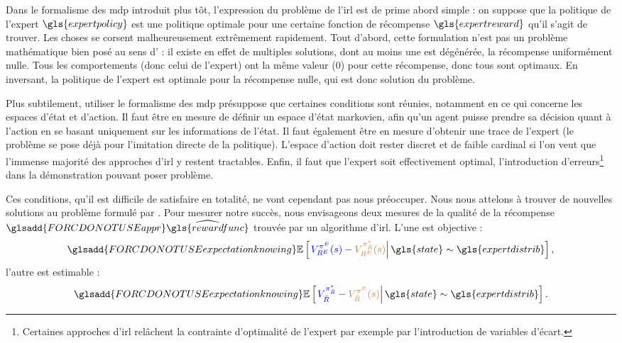\documentclass[frenchb,a4paper,justified,notoc]{tufte-book}
\newcommand{\rewardfunc}{\gls{rewardfunc}}
\newcommand{\expertreward}{\gls{expertreward}}
\newcommand{\state}{\gls{state}}
\newcommand{\expertpolicy}{\gls{expertpolicy}}
\newcommand{\expertdistrib}{\gls{expertdistrib}}
\newcommand{\appr}[1]{\ensuremath{\glsadd{FORCDONOTUSEappr}\widehat{#1}}}
\newcommand{\expectationknowing}[2]{\ensuremath{\glsadd{FORCDONOTUSEexpectationknowing}\mathbb{E} \left[\left. #1\right|#2\right]}}
\begin{document}
Dans le formalisme des \gls{mdp} introduit plus tôt, l'expression du problème de l'\gls{irl} est de prime abord simple : on suppose que la politique de l'expert $\expertpolicy$ est une politique optimale pour une certaine fonction de récompense $\expertreward$ qu'il s'agit de trouver.
Les choses se corsent malheureusement extrêmement rapidement. Tout d'abord, cette formulation n'est pas un problème mathématique bien posé au sens d'\citet{hadamard1902problemes} : il existe en effet de multiples solutions, dont au moins une est dégénérée, la récompense uniformément nulle. Tous les comportements (donc celui de l'expert) ont la même valeur ($0$) pour cette récompense, donc tous sont optimaux. En inversant, la politique de l'expert est optimale pour la récompense nulle, qui est donc solution du problème.

Plus subtilement, utiliser le formalisme des \gls{mdp} présuppose que certaines conditions sont réunies, notamment en ce qui concerne les espaces d'état et d'action. Il faut être en mesure de définir un espace d'état markovien, afin qu'un agent puisse prendre sa décision quant à l'action en se basant uniquement sur les informations de l'état. Il faut également être en mesure d'obtenir une trace de l'expert (le problème se pose déjà pour l'imitation directe de la politique). L'espace d'action doit rester discret et de faible cardinal si l'on veut que l'immense majorité des approches d'\gls{irl} y restent tractables. Enfin, il faut que l'expert soit effectivement optimal, l'introduction d'erreurs\footnote{Certaines approches d'\gls{irl} relâchent la contrainte d'optimalité de l'expert par exemple par l'introduction de variables d'écart.
 } dans la démonstration pouvant poser problème.

Ces conditions, qu'il est difficile de satisfaire en totalité, ne vont cependant pas nous préoccuper. Nous nous attelons à trouver de nouvelles solutions au problème formulé par \citet{russell1998learning}. Pour mesurer notre succès, nous envisageons deux mesures de la qualité de la récompense $\appr{\rewardfunc}$ trouvée par un algorithme d'\gls{irl}. L'une est objective :
\begin{equation}
\expectationknowing{{\color{blue}V^{\pi^E}_{R^E}(s)} - {\color{brown}V^{\pi^*_{\hat{R}}}_{R^E}(s)}}{\state\sim\expertdistrib},
\label{eq:aricriterebis}
\end{equation}
l'autre est estimable :
\begin{equation}
\expectationknowing{{\color{blue}V^{\pi^*_{\hat{R}}}_{\hat{R}}} - {\color{brown}V^{\pi^E}_{\hat{R}}(s)}}{\state \sim \expertdistrib}.
\label{eq:aricritere}
\end{equation}
\end{document}
